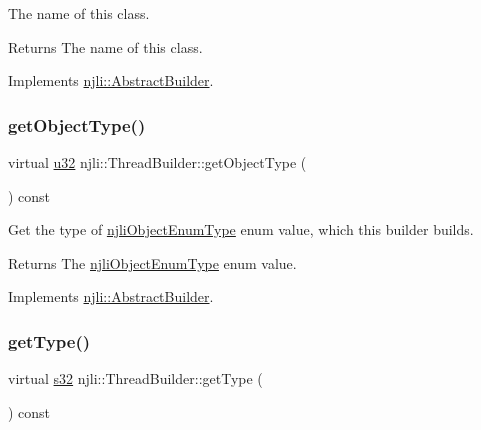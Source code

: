 The name of this class.

\begin{DoxyReturn}{Returns}
The name of this class. 
\end{DoxyReturn}


Implements \mbox{\hyperlink{classnjli_1_1_abstract_builder_a902f73ea78031b06aca183a417f3413b}{njli\+::\+Abstract\+Builder}}.

\mbox{\label{classnjli_1_1_thread_builder_aadf8787251238303ea4ed66d3646720c}} 
\subsubsection{\texorpdfstring{get\+Object\+Type()}{getObjectType()}}
{\footnotesize\ttfamily virtual \mbox{\hyperlink{_util_8h_a10e94b422ef0c20dcdec20d31a1f5049}{u32}} njli\+::\+Thread\+Builder\+::get\+Object\+Type (\begin{DoxyParamCaption}{ }\end{DoxyParamCaption}) const\hspace{0.3cm}{\ttfamily [virtual]}}

Get the type of \mbox{\hyperlink{namespacenjli_a6d56d4fbaf89fcf3e3d32839df05b444}{njli\+Object\+Enum\+Type}} enum value, which this builder builds.

\begin{DoxyReturn}{Returns}
The \mbox{\hyperlink{namespacenjli_a6d56d4fbaf89fcf3e3d32839df05b444}{njli\+Object\+Enum\+Type}} enum value. 
\end{DoxyReturn}


Implements \mbox{\hyperlink{classnjli_1_1_abstract_builder_a0f2d344fcf697b167f4f2b1122b5fb33}{njli\+::\+Abstract\+Builder}}.

\mbox{\label{classnjli_1_1_thread_builder_a204ebecd17055ed8c61a4728e289d329}} 
\subsubsection{\texorpdfstring{get\+Type()}{getType()}}
{\footnotesize\ttfamily virtual \mbox{\hyperlink{_util_8h_aa62c75d314a0d1f37f79c4b73b2292e2}{s32}} njli\+::\+Thread\+Builder\+::get\+Type (\begin{DoxyParamCaption}{ }\end{DoxyParamCaption}) const\hspace{0.3cm}{\ttfamily [virtual]}}

